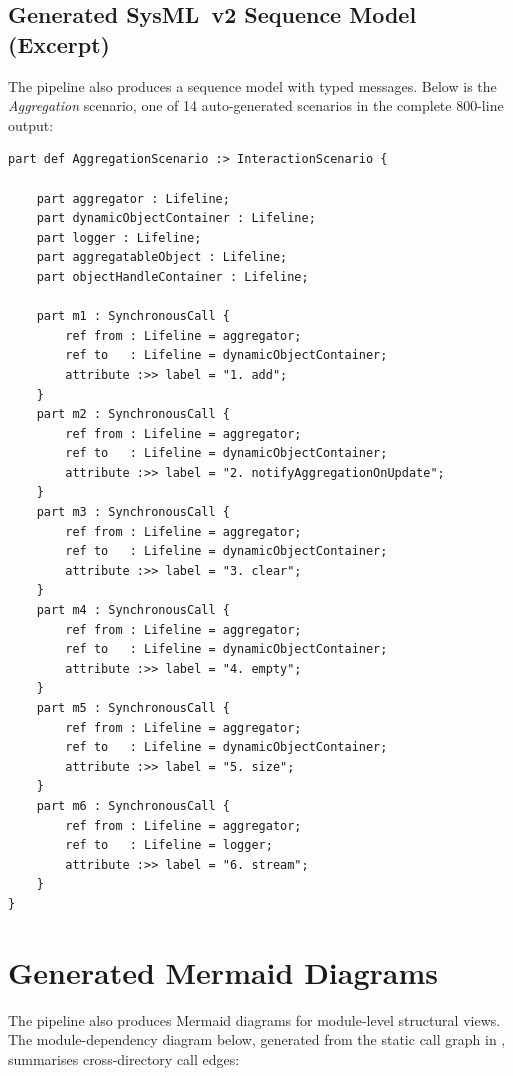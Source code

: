 \subsection{Generated SysML~v2 Sequence Model (Excerpt)}

The pipeline also produces a \sysml sequence model with typed messages.
Below is the \emph{Aggregation} scenario, one of 14 auto-generated
scenarios in the complete 800-line output:

\begin{verbatim}
part def AggregationScenario :> InteractionScenario {

    part aggregator : Lifeline;
    part dynamicObjectContainer : Lifeline;
    part logger : Lifeline;
    part aggregatableObject : Lifeline;
    part objectHandleContainer : Lifeline;

    part m1 : SynchronousCall {
        ref from : Lifeline = aggregator;
        ref to   : Lifeline = dynamicObjectContainer;
        attribute :>> label = "1. add";
    }
    part m2 : SynchronousCall {
        ref from : Lifeline = aggregator;
        ref to   : Lifeline = dynamicObjectContainer;
        attribute :>> label = "2. notifyAggregationOnUpdate";
    }
    part m3 : SynchronousCall {
        ref from : Lifeline = aggregator;
        ref to   : Lifeline = dynamicObjectContainer;
        attribute :>> label = "3. clear";
    }
    part m4 : SynchronousCall {
        ref from : Lifeline = aggregator;
        ref to   : Lifeline = dynamicObjectContainer;
        attribute :>> label = "4. empty";
    }
    part m5 : SynchronousCall {
        ref from : Lifeline = aggregator;
        ref to   : Lifeline = dynamicObjectContainer;
        attribute :>> label = "5. size";
    }
    part m6 : SynchronousCall {
        ref from : Lifeline = aggregator;
        ref to   : Lifeline = logger;
        attribute :>> label = "6. stream";
    }
}
\end{verbatim}

\section{Generated Mermaid Diagrams}
\label{sec:appendix-mermaid}

The pipeline also produces Mermaid diagrams for module-level structural
views. The module-dependency diagram below, generated from the static
call graph in \neo, summarises cross-directory call edges:

